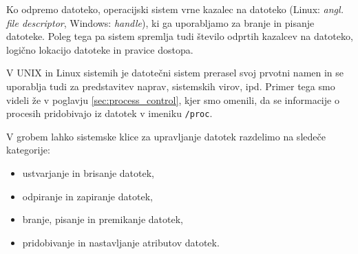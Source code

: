 \documentclass[a4paper,12pt,openright]{book}
\begin{document}
Ko odpremo datoteko, operacijski sistem vrne kazalec na datoteko (Linux: \textit{angl. file descriptor}, Windows: \textit{handle}), ki ga uporabljamo za branje in pisanje datoteke.
Poleg tega pa sistem spremlja tudi število odprtih kazalcev na datoteko, logično lokacijo datoteke in pravice dostopa.
\cite{Silberschatz_Galvin_Gagne_2018}

V UNIX in Linux sistemih je datotečni sistem prerasel svoj prvotni namen in se uporablja tudi za predstavitev naprav, sistemskih virov, ipd.
Primer tega smo videli že v poglavju \ref{sec:process_control}, kjer smo omenili, da se informacije o procesih pridobivajo iz datotek v imeniku \verb|/proc|.


V grobem lahko sistemske klice za upravljanje datotek razdelimo na sledeče kategorije:
\begin{itemize}
	\item ustvarjanje in brisanje datotek,
	\item odpiranje in zapiranje datotek,
	\item branje, pisanje in premikanje datotek,
	\item pridobivanje in nastavljanje atributov datotek.\cite{Silberschatz_Galvin_Gagne_2018}
\end{itemize}
\end{document}
